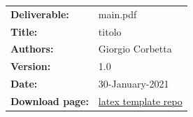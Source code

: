 \begin{table}[h!]
\begin{tabu} to \textwidth { X[0.3,r,p] X[0.7,l,p] }
\hline

\textbf{Deliverable:} & main.pdf\\
\textbf{Title:} & titolo \\
\textbf{Authors:} & Giorgio Corbetta \\
\textbf{Version:} & 1.0 \\
\textbf{Date:} & 30-January-2021 \\
\textbf{Download page:} & \href{https://github.com/giocor98/latexTemplate}{latex template repo} \\
\hline
\end{tabu}
\end{table}




\setcounter{page}{2}


\newpage
{}
\tableofcontents
\newpage

\clearpage
{}
\label{sect:introduction}


\clearpage
{}



\printbibliography


